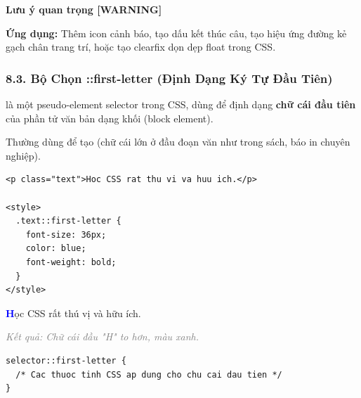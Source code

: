 \begin{browserWindow}
\sffamily\large\bfseries
Lưu ý quan trọng [WARNING]
\end{browserWindow}

\begin{conceptBox}
\textbf{Ứng dụng:} Thêm icon cảnh báo, tạo dấu kết thúc câu, tạo hiệu ứng đường kẻ gạch chân trang trí, hoặc tạo clearfix dọn dẹp float trong CSS.
\end{conceptBox}

\subsubsection{8.3. Bộ Chọn ::first-letter (Định Dạng Ký Tự Đầu Tiên)}

\begin{conceptBox}
 là một pseudo-element selector trong CSS, dùng để định dạng \textbf{chữ cái đầu tiên} của phần tử văn bản dạng khối (block element).
\par\vspace{4pt}
Thường dùng để tạo  (chữ cái lớn ở đầu đoạn văn như trong sách, báo in chuyên nghiệp).
\end{conceptBox}

\begin{codeWindow}
\begin{lstlisting}[language=HTML5]
<p class="text">Hoc CSS rat thu vi va huu ich.</p>

<style>
  .text::first-letter {
    font-size: 36px;
    color: blue;
    font-weight: bold;
  }
</style>
\end{lstlisting}
\end{codeWindow}

\begin{browserWindow}
\sffamily\small
\textbf{\Large\textcolor{blue}{H}}ọc CSS rất thú vị và hữu ích. \par\vspace{2pt}
{\scriptsize\textcolor{gray}{\textit{Kết quả: Chữ cái đầu "H" to hơn, màu xanh.}}}
\end{browserWindow}

\begin{codeWindow}
\begin{lstlisting}[language=CSS3]
selector::first-letter {
  /* Cac thuoc tinh CSS ap dung cho chu cai dau tien */
}
\end{lstlisting}
\end{codeWindow}

